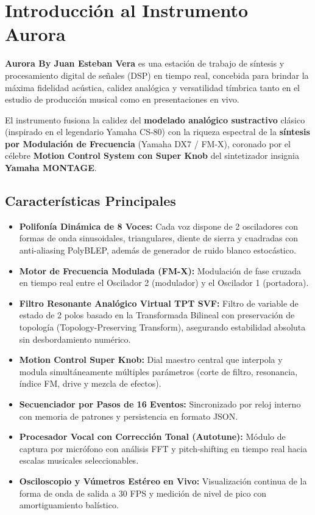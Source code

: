 \documentclass[11pt,a4paper]{article}
\begin{document}
\section{Introducción al Instrumento Aurora}

\textbf{Aurora By Juan Esteban Vera} es una estación de trabajo de síntesis y procesamiento digital de señales (DSP) en tiempo real, concebida para brindar la máxima fidelidad acústica, calidez analógica y versatilidad tímbrica tanto en el estudio de producción musical como en presentaciones en vivo.

El instrumento fusiona la calidez del \textbf{modelado analógico sustractivo} clásico (inspirado en el legendario Yamaha CS-80) con la riqueza espectral de la \textbf{síntesis por Modulación de Frecuencia} (Yamaha DX7 / FM-X), coronado por el célebre \textbf{Motion Control System con Super Knob} del sintetizador insignia \textbf{Yamaha MONTAGE}.

\subsection{Características Principales}
\begin{itemize}[leftmargin=1.5cm]
    \item \textbf{Polifonía Dinámica de 8 Voces:} Cada voz dispone de 2 osciladores con formas de onda sinusoidales, triangulares, diente de sierra y cuadradas con anti-aliasing PolyBLEP, además de generador de ruido blanco estocástico.
    \item \textbf{Motor de Frecuencia Modulada (FM-X):} Modulación de fase cruzada en tiempo real entre el Oscilador 2 (modulador) y el Oscilador 1 (portadora).
    \item \textbf{Filtro Resonante Analógico Virtual TPT SVF:} Filtro de variable de estado de 2 polos basado en la Transformada Bilineal con preservación de topología (Topology-Preserving Transform), asegurando estabilidad absoluta sin desbordamiento numérico.
    \item \textbf{Motion Control Super Knob:} Dial maestro central que interpola y modula simultáneamente múltiples parámetros (corte de filtro, resonancia, índice FM, drive y mezcla de efectos).
    \item \textbf{Secuenciador por Pasos de 16 Eventos:} Sincronizado por reloj interno con memoria de patrones y persistencia en formato JSON.
    \item \textbf{Procesador Vocal con Corrección Tonal (Autotune):} Módulo de captura por micrófono con análisis FFT y pitch-shifting en tiempo real hacia escalas musicales seleccionables.
    \item \textbf{Osciloscopio y Vúmetros Estéreo en Vivo:} Visualización continua de la forma de onda de salida a 30 FPS y medición de nivel de pico con amortiguamiento balístico.
\end{itemize}
\end{document}
